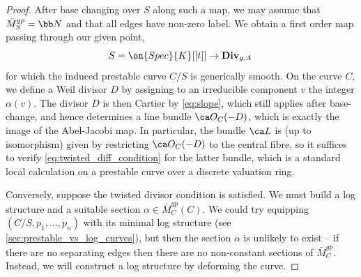 \begin{proof}
After base changing over $S$ along such a map, we may assume
that $\bar M_S^{gp} = \bb N$ and that all edges have non-zero label.
We  obtain a first order map passing through our given point,
$$S = \on{Spec} {\field}[[t]] \to \cat{Div}_{g,A}\, $$
for which the induced prestable curve $C/S$ is generically smooth. On the curve $C$, we define a Weil divisor $D$ by assigning to an irreducible component $v$ the integer $\alpha(v)$. The divisor $D$ is then Cartier by \eqref{eq:slope}, which still applies after base-change, and hence determines a line bundle $\ca O_C(-D)$, which is exactly the image of the Abel-Jacobi map. In particular, the bundle $\ca L$ is (up to isomorphism) given by restricting $\ca O_C(-D)$ to the central fibre, so it suffices to verify \eqref{eq:twisted_diff_condition} for the latter bundle, which is a standard local calculation on a prestable curve over a discrete valuation ring.


%


Conversely, suppose the twisted divisor condition is satisfied. We must build a log structure and a suitable section $\alpha \in \bar M_C^{gp}(C)$. We could try equipping $(C/S, p_1, \dots, p_n)$ with its minimal log structure (see \cref{sec:prestable_vs_log_curves}), but then the section $\alpha$ is
unlikely to exist -- if there are no separating edges then there are no non-constant sections of $\bar M_C^{gp}$. Instead, we will construct a log structure by deforming the curve.


\end{proof}
